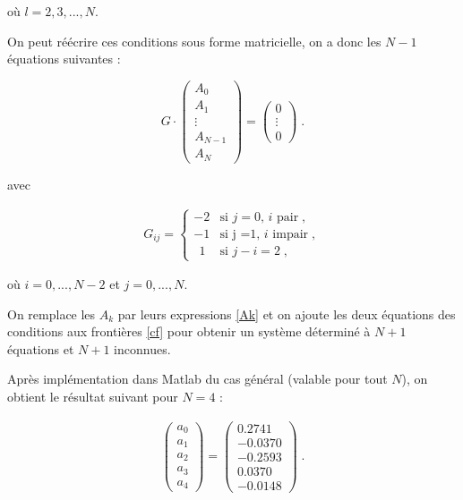 \documentclass{report}
\begin{document}
où $l=2,3,...,N$.

On peut réécrire ces conditions sous forme matricielle, on a donc les $N-1$ équations suivantes :

\begin{equation}
G \cdot
\begin{pmatrix}
 A_{0}\\ 
 A_{1}\\ 
 \vdots\\ 
 A_{N-1}\\ 
 A_{N}
\end{pmatrix} 
= 
\begin{pmatrix} 
 0\\ 
 \vdots\\ 
 0
 \end{pmatrix}\;.
\end{equation}

avec

\begin{align}
G_{ij} = \begin{cases}
-2 & \text{si $j=0$, $i$ pair}\;, \\
-1 & \text{si j =1, $i$ impair}\;,\\
\ \ 1 & \text{si $j-i=2$}\;,
  \end{cases}
\end{align}

où $i = 0,...,N-2$ et $j =0,...,N$.

On remplace les $A_{k}$ par leurs expressions \eqref{Ak} et on ajoute les deux équations des conditions aux frontières \eqref{cf} pour obtenir un système déterminé à $N+1$ équations et $N+1$ inconnues.

 Après implémentation dans Matlab du cas général (valable pour tout $N$), on obtient le résultat suivant pour $N=4$ :

\begin{eqnarray}
\begin{pmatrix}
 a_0\\ 
 a_1\\ 
 a_2\\ 
 a_3\\ 
 a_4 
 \end{pmatrix}
 = \left(
\begin{array}{r}
  0.2741\\ 
 -0.0370\\ 
 -0.2593\\ 
 0.0370\\ 
 -0.0148 
 \end{array}\right)\;.
\end{eqnarray} 
\end{document}
